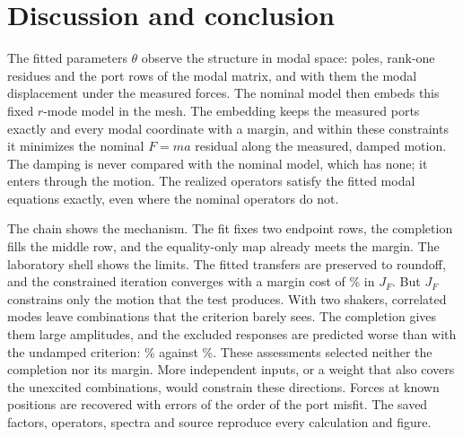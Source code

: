 \section{Discussion and conclusion}\label{sec:discussion}
The fitted parameters $\theta$ observe the structure in modal space: poles,
rank-one residues and the port rows of the modal matrix, and with them the
modal displacement under the measured forces. The nominal model then embeds
this fixed $r$-mode model in the mesh. The embedding keeps the measured
ports exactly and every modal coordinate with a margin, and within these
constraints it minimizes the nominal $F=ma$ residual along the measured,
damped motion. The damping is never compared with the nominal model, which
has none; it enters through the motion. The realized operators satisfy the
fitted modal equations exactly, even where the nominal operators do not.

The chain shows the mechanism. The fit fixes two endpoint rows, the
completion fills the middle row, and the equality-only map already meets
the margin. The laboratory shell shows the limits. The fitted transfers are
preserved to roundoff, and the constrained iteration converges with a
margin cost of \LabMarginCost\% in $J_F$. But $J_F$ constrains only the
motion that the test produces. With two shakers, correlated modes leave
combinations that the criterion barely sees. The completion gives them
large amplitudes, and the excluded responses are predicted worse than with
the undamped criterion: \LabExcludedError\% against
\LabExcludedErrorJZero\%. These assessments selected neither the completion
nor its margin. More independent inputs, or a weight that also covers the
unexcited combinations, would constrain these directions. Forces at known
positions are recovered with errors of the order of the port misfit. The
saved factors, operators, spectra and source reproduce every calculation
and figure.
